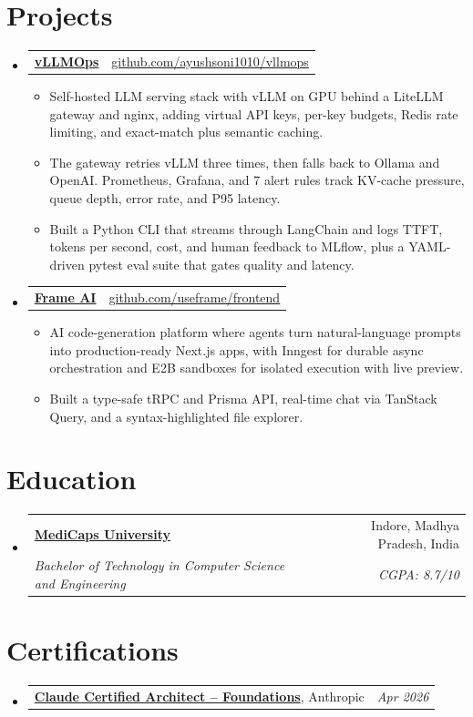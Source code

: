 \documentclass[letterpaper,10pt]{article}
\makeatletter
\newcommand{\roleGap}{7pt}
\newcommand{\entryListStart}{\begin{itemize}[leftmargin=0.15in, label={}, itemsep=\roleGap, topsep=0pt, parsep=0pt, partopsep=0pt]}
\newcommand{\entryListEnd}{\end{itemize}}
\newcommand{\bulletListStart}{\begin{itemize}[itemsep=2pt, topsep=2pt, parsep=0pt, partopsep=0pt]}
\newcommand{\bulletListEnd}{\end{itemize}}
\newcommand{\resumeItem}[1]{\item #1}
\newcommand{\role}[4]{%
  \needspace{4\baselineskip}%
  \item
  \begin{tabular*}{\linewidth}[t]{@{}l@{\extracolsep{\fill}}r@{}}
    \textbf{#1} & #2 \\
    {\itshape #3} & {\itshape #4} \\
  \end{tabular*}%
}
\newcommand{\project}[4]{%
  \needspace{4\baselineskip}%
  \item
  \begin{tabular*}{\linewidth}[t]{@{}l@{\extracolsep{\fill}}r@{}}
    \textbf{\href{#4}{#1}}\hspace{6pt}{\itshape #2} & \href{#4}{\underline{#3}} \\
  \end{tabular*}%
}
\newcommand{\simpleEntry}[2]{%
  \item
  \begin{tabular*}{\linewidth}[t]{@{}l@{\extracolsep{\fill}}r@{}}
    #1 & {\itshape #2} \\
  \end{tabular*}%
}
\makeatother
\begin{document}
\section{Projects}
\entryListStart
\project{vLLMOps}{Python, vLLM, LiteLLM, LangChain, MLflow, Docker}{github.com/ayushsoni1010/vllmops}{https://github.com/ayushsoni1010/vllmops}
\bulletListStart
  \resumeItem{Self-hosted LLM serving stack with vLLM on GPU behind a LiteLLM gateway and nginx, adding virtual API keys, per-key budgets, Redis rate limiting, and exact-match plus semantic caching.}
  \resumeItem{The gateway retries vLLM three times, then falls back to Ollama and OpenAI. Prometheus, Grafana, and 7 alert rules track KV-cache pressure, queue depth, error rate, and P95 latency.}
  \resumeItem{Built a Python CLI that streams through LangChain and logs TTFT, tokens per second, cost, and human feedback to MLflow, plus a YAML-driven pytest eval suite that gates quality and latency.}
\bulletListEnd

\project{Frame AI}{Next.js, tRPC, Prisma, Supabase, Inngest, E2B, AI Agents}{github.com/useframe/frontend}{https://github.com/useframe/frontend}
\bulletListStart
  \resumeItem{AI code-generation platform where agents turn natural-language prompts into production-ready Next.js apps, with Inngest for durable async orchestration and E2B sandboxes for isolated execution with live preview.}
  \resumeItem{Built a type-safe tRPC and Prisma API, real-time chat via TanStack Query, and a syntax-highlighted file explorer.}
\bulletListEnd
\entryListEnd

\section{Education}
\entryListStart
\role{\href{https://www.medicaps.ac.in}{MediCaps University}}{Indore, Madhya Pradesh, India}{Bachelor of Technology in Computer Science and Engineering}{CGPA: 8.7/10}
\entryListEnd

\section{Certifications}
\entryListStart
\simpleEntry{\textbf{\href{https://www.credly.com/badges/ec1428c9-7b75-4060-a435-b2eba654e539}{Claude Certified Architect -- Foundations}}, Anthropic}{Apr 2026}
\entryListEnd

\end{document}
